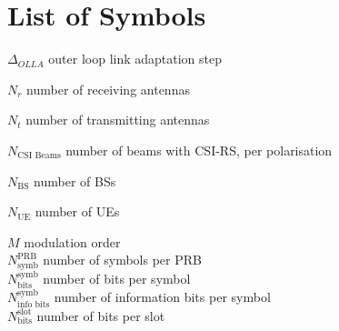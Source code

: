 














\newcommand\mytab{\tab \hspace{-5cm}}




\chapter*{List of Symbols}
$\Delta_{OLLA}$ \mytab outer loop link adaptation step

$N_r$ \mytab number of receiving antennas

$N_t$ \mytab number of transmitting antennas

$N_\text{CSI Beams}$ \mytab number of beams with CSI-RS, per polarisation

$N_\text{BS}$ \mytab number of \acp{BS}

$N_\text{UE}$ \mytab number of \acp{UE}

$M$ \mytab modulation order \\
$N_\text{symb}^\text{PRB}$ \mytab number of symbols per PRB \\
$N_\text{bits}^\text{symb}$ \mytab       number of bits per symbol \\
$N_\text{info bits}^\text{symb}$ \mytab  number of information bits per symbol \\
$N_\text{bits}^\text{slot}$ \mytab       number of bits per slot

